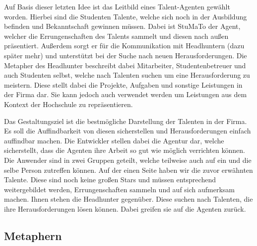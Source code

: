 \documentclass[
  12pt,
  ngerman,
  a4paper,
]{article}
\begin{document}
Auf Basis dieser letzten Idee ist das Leitbild eines Talent-Agenten
gewählt worden. Hierbei sind die Studenten Talente, welche sich noch in
der Ausbildung befinden und Bekanntschaft gewinnen müssen. Dabei ist
StuMaTo der Agent, welcher die Errungenschaften des Talents sammelt und
diesen nach außen präsentiert. Außerdem sorgt er für die Kommunikation
mit Headhuntern (dazu später mehr) und unterstützt bei der Suche nach
neuen Herausforderungen. Die Metapher des Headhunter beschreibt dabei
Mitarbeiter, Studentenbetreuer und auch Studenten selbst, welche nach
Talenten suchen um eine Herausforderung zu meistern. Diese stellt dabei
die Projekte, Aufgaben und sonstige Leistungen in der Firma dar. Sie
kann jedoch auch verwendet werden um Leistungen aus dem Kontext der
Hochschule zu repräsentieren.

Das Gestaltungsziel ist die bestmögliche Darstellung der Talenten in der
Firma. Es soll die Auffindbarkeit von diesen sicherstellen und
Herausforderungen einfach auffindbar machen. Die Entwickler stellen
dabei die Agentur dar, welche sicherstellt, dass die Agenten ihre Arbeit
so gut wie möglich verrichten können. Die Anwender sind in zwei Gruppen
geteilt, welche teilweise auch auf ein und die selbe Person zutreffen
können. Auf der einen Seite haben wir die zuvor erwähnten Talente. Diese
sind noch keine großen Stars und müssen entsprechend weitergebildet
werden, Errungenschaften sammeln und auf sich aufmerksam machen. Ihnen
stehen die Headhunter gegenüber. Diese suchen nach Talenten, die ihre
Herausforderungen lösen können. Dabei greifen sie auf die Agenten
zurück.

\hypertarget{metaphern}{%
\subsection{Metaphern}\label{metaphern}}
\end{document}
